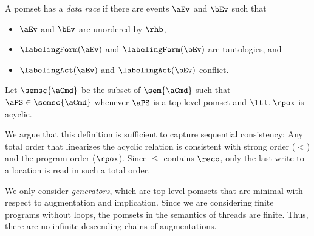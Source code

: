 A pomset has a \emph{data race} if there are events $\aEv$ and $\bEv$ such
that
\begin{itemize}
\item $\aEv$ and $\bEv$ are unordered by $\rhb$,
\item $\labelingForm(\aEv)$ and $\labelingForm(\bEv)$ are tautologies, and
\item $\labelingAct(\aEv)$ and $\labelingAct(\bEv)$ conflict.
\end{itemize}

\begin{definition}
  Let $\semsc{\aCmd}$ be the subset of $\sem{\aCmd}$ such that
  $\aPS\in\semsc{\aCmd}$ whenever $\aPS$ is a top-level pomset and ${\lt}\cup{\rpox}$ is acyclic.
\end{definition}
We argue that this definition is sufficient to capture sequential
consistency: Any total order that linearizes the acyclic relation is
consistent with strong order ($\lt$) and the program order ($\rpox$).  Since $\le$ contains $\reco$, only the last write to a location is
read in such a total order.

We only consider \emph{generators}, which are top-level pomsets that are
minimal with respect to augmentation and implication.  Since we are
considering finite programs without loops, the pomsets in the semantics of
threads are finite.  Thus, there are no infinite descending chains of
augmentations.



